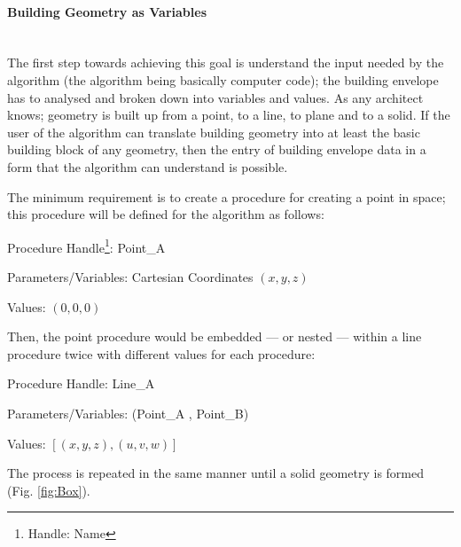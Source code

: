 \documentclass[11pt,a4paper,oneside]{article}
\begin{document}
\begin{multicols}{2}
	\paragraph{Building Geometry as Variables}\mbox{}\\[3mm]
The first step towards achieving this goal is understand the input needed by the algorithm (the algorithm being basically computer code); the building envelope has to analysed and broken down into variables and values. As any architect knows; geometry is built up from a point, to a line, to plane and to a solid. If the user of the algorithm can translate building geometry into at least the basic building block of any geometry, then the entry of building envelope data in a form that the algorithm can understand is possible.

The minimum requirement is to create a procedure for creating a point in space; this procedure will be defined for the algorithm as follows:
\begin{compactitem}[\footnotesize$\bullet$]
\item	{Procedure Handle\footnote{Handle: Name}:} Point\_A
\item	{Parameters/Variables:} Cartesian Coordinates $(x,y,z)$
\item	{Values:} $(0,0,0)$
\end{compactitem}
Then, the point procedure would be embedded --- or nested --- within a line procedure twice with different values for each procedure:
\begin{compactitem}[\footnotesize$\bullet$]
\item	{Procedure Handle:} Line\_A
\item	{Parameters/Variables:} ({Point\_A , Point\_B})
\item	{Values:} $[(x,y,z),(u,v,w)]$
\end{compactitem}
The process is repeated in the same manner until a solid geometry is formed (Fig. \ref{fig:Box}).


\end{multicols}
\end{document}

